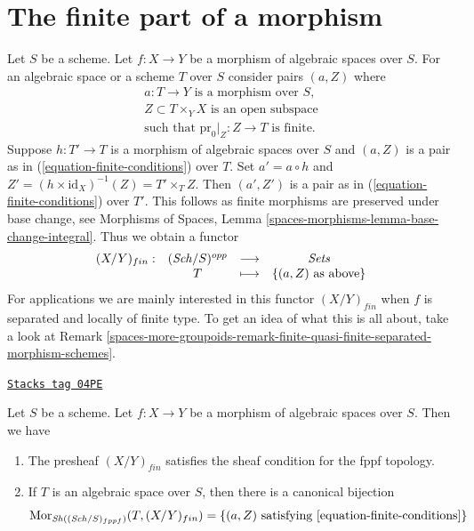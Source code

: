 \section{The finite part of a morphism}
\label{spaces-more-groupoids-section-finite}
Let $S$ be a scheme.
Let $f : X \to Y$ be a morphism of algebraic spaces over $S$.
For an algebraic space or a scheme $T$ over $S$ consider pairs
$(a, Z)$ where
\begin{equation}
\label{equation-finite-conditions}
\begin{matrix}
a : T \to Y\text{ is a morphism over }S, \\
Z \subset T \times_Y X\text{ is an open subspace} \\
\text{such that }\text{pr}_0|_Z : Z \to T\text{ is finite.}
\end{matrix}
\end{equation}
Suppose $h : T' \to T$ is a morphism of algebraic spaces over $S$
and $(a, Z)$ is a pair as in (\ref{equation-finite-conditions}) over $T$. Set
$a' = a \circ h$ and $Z' = (h \times \text{id}_X)^{-1}(Z) = T' \times_T Z$.
Then $(a', Z')$ is a pair as in (\ref{equation-finite-conditions}) over $T'$.
This follows as finite morphisms are preserved under base change, see
Morphisms of Spaces, Lemma \ref{spaces-morphisms-lemma-base-change-integral}.
Thus we obtain a functor
\begin{equation}
\label{equation-finite}
\begin{matrix}
(X/Y)_{fin} : &
(\mathit{Sch}/S)^{opp} &
\longrightarrow &
\textit{Sets} \\
& T & \longmapsto &
\{(a, Z)\text{ as above}\}
\end{matrix}
\end{equation}
For applications we are mainly interested in this functor $(X/Y)_{fin}$
when $f$ is separated and locally of finite type. To get an idea
of what this is all about, take a look at
Remark \ref{spaces-more-groupoids-remark-finite-quasi-finite-separated-morphism-schemes}.

\begin{lemma}
\label{spaces-more-groupoids-lemma-finite-sheaf}
\href{https://stacks.math.columbia.edu/tag/04PE}{\texttt{Stacks tag 04PE}}

Let $S$ be a scheme.
Let $f : X \to Y$ be a morphism of algebraic spaces over $S$.
Then we have
\begin{enumerate}
\item The presheaf $(X/Y)_{fin}$ satisfies the sheaf condition for
the fppf topology.
\item If $T$ is an algebraic space over $S$, then there is a
canonical bijection
$$
\operatorname{Mor}_{\mathit{Sh}((\mathit{Sch}/S)_{fppf})}(T, (X/Y)_{fin})
=
\{(a, Z)\text{ satisfying \ref{equation-finite-conditions}}\}
$$
\end{enumerate}
\end{lemma}

